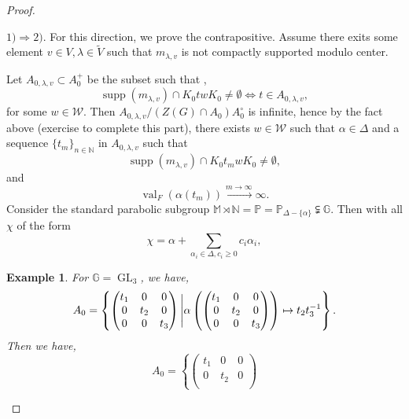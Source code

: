 \documentclass[8pt]{article}
\newtheorem{example}{Example}[section]
\DeclareMathOperator{\GL}{GL}
\DeclareMathOperator{\supp}{supp}
\DeclareMathOperator{\val}{val}
\newcommand{\N}[0]{\mathbb{N}}
\newcommand{\G}[0]{\mathbb{G}}
\newcommand{\Para}[0]{\mathbb{P}}
\newcommand{\M}[0]{\mathbb{M}}
\begin{document}
\begin{proof}$\:$
  \par $1)\Rightarrow 2)$. For this direction, we prove the contrapositive. Assume there exits some element $v\in V,\lambda\in\widetilde{V}$ such that $m_{\lambda,v}$ is not compactly supported modulo center.
  \par Let $A_{0,\lambda,v}\subset A_0^+$ be the subset such that ,
  \begin{equation*}
    \supp(m_{\lambda,v})\cap K_0twK_0 \not=\emptyset \Leftrightarrow t\in A_{0,\lambda,v},
  \end{equation*}
  for some $w\in\mathcal{W}$. Then $A_{0,\lambda,v}/(Z(G)\cap A_0)A_0^\circ$ is infinite, hence by the fact above (exercise to complete this part), there exists $w\in\mathcal{W}$ such that $\alpha\in\Delta$ and a sequence $\{t_m\}_{n\in\N}$ in $A_{0,\lambda,v}$ such that 
  \begin{equation*}
    \supp(m_{\lambda,v})\cap K_0t_mwK_0\not=\emptyset,
  \end{equation*}
  and 
  \begin{equation*}
    \val_F(\alpha(t_m))\stackrel{m\to\infty}{\to}\infty.
  \end{equation*}
  Consider the standard parabolic subgroup $\M\rtimes \N=\Para = \Para_{\Delta-\{\alpha\}}\subsetneqq \G$. Then with all $\chi$ of the form 
  \begin{equation*}
    \chi = \alpha +\sum_{\alpha_i\in\Delta,c_i\geq 0}c_i\alpha_i,
  \end{equation*}
  \begin{example}
    For $\G=\GL_3$, we have,
    \begin{equation*}
      A_0 = \left\{\begin{pmatrix}
      t_1 & 0 & 0 \\
      0 & t_2 & 0 \\
      0 & 0 & t_3
      \end{pmatrix}\Bigg{|}\alpha\left(\begin{pmatrix}
      t_1 & 0 & 0 \\
      0 & t_2 & 0 \\
      0 & 0 & t_3
      \end{pmatrix}\right)\mapsto t_2t_3^{-1}\right\}.
    \end{equation*}
    Then we have,
    \begin{equation*}
      A_0 = \left\{\begin{pmatrix}
      t_1 & 0 & 0 \\
      0 & t_2 & 0 \\

\end{pmatrix}
\end{equation*}
\end{example}
\end{proof}
\end{document}
